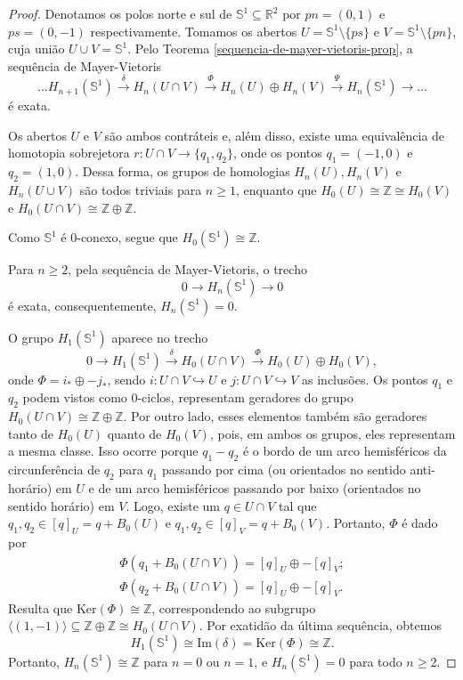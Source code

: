 \begin{proof}
    Denotamos os polos norte e sul de $\mathbb{S}^1\subseteq \mathbb{R}^2$ por $pn=(0,1)$ e $ps=(0,-1)$ respectivamente. Tomamos os abertos $U=\mathbb{S}^1\setminus \{ps\}$ e $V=\mathbb{S}^1\setminus \{pn\}$, cuja união $U\cup V=\mathbb{S}^1$. Pelo Teorema \ref{sequencia-de-mayer-vietoris-prop}, a sequência de Mayer-Vietoris
    \[...H_{n+1}(\mathbb{S}^1)\xrightarrow{\delta} H_n(U\cap V)\xrightarrow{\Phi}H_n(U)\oplus H_n(V)\xrightarrow{\Psi} H_n(\mathbb{S}^1)\rightarrow ...\]
    é exata.

    Os abertos $U$ e $V$ são ambos contráteis e, além disso, existe uma equivalência de homotopia sobrejetora $r:U\cap V\rightarrow\{q_1,q_2\}$, onde os pontos $q_1=(-1,0)$ e $q_2=(1,0)$. Dessa forma, os grupos de homologias $H_n(U),H_n(V)$ e $H_n(U\cup V)$ são todos triviais para $n\ge 1$, enquanto que $H_0(U)\cong \mathbb{Z}\cong H_0 (V)$ e $H_0 (U\cap V)\cong \mathbb{Z}\oplus \mathbb{Z}$.

    Como $\mathbb{S}^1$ é 0-conexo, segue que $H_0(\mathbb{S}^1)\cong \mathbb{Z}$.

    Para $n\ge 2$, pela sequência de Mayer-Vietoris, o trecho  
    \[0\rightarrow H_n (\mathbb{S}^1)\rightarrow 0\]
    é exata, consequentemente, $H_n(\mathbb{S}^1)=0.$

    O grupo $H_1(\mathbb{S}^1)$ aparece no trecho 
    \[0\rightarrow H_1(\mathbb{S}^1)\xrightarrow{\delta} H_0 (U\cap V)\xrightarrow{\Phi} H_0(U)\oplus H_0 (V),\]
    onde $\Phi=i_*\oplus -j_*$, sendo $i:U\cap V\hookrightarrow U$ e $j:U\cap V\hookrightarrow V$ as inclusões. Os pontos $q_1$ e $q_2$ podem vistos como 0-ciclos, representam geradores do grupo $H_0(U\cap V)\cong \mathbb{Z}\oplus \mathbb{Z}$. Por outro lado, esses elementos também são geradores tanto de $H_0 (U)$ quanto de $H_0(V)$, pois, em ambos os grupos, eles representam a mesma classe. Isso ocorre porque $q_1-q_2$ é o bordo de um arco hemisféricos da circunferência de $q_2$ para $q_1$ passando por cima (ou orientados no sentido anti-horário) em $U$ e de um arco hemisféricos passando por baixo (orientados no sentido horário) em $V$. Logo, existe um $q\in U\cap V$ tal que $q_1,q_2\in [q]_U=q+B_0 (U)$ e $q_1,q_2\in [q]_V=q+B_0 (V)$. Portanto, $\Phi$ é dado por 
    \begin{align*}
        \Phi(q_1+B_0(U\cap V))=[q]_U\oplus-[q]_V;\\
        \Phi(q_2+B_0(U\cap V))=[q]_U\oplus -[q]_V.
    \end{align*}
    Resulta que $\text{Ker}(\Phi)\cong \mathbb{Z}$, correspondendo ao subgrupo $\langle (1,-1) \rangle\subseteq \mathbb{Z}\oplus \mathbb{Z}\cong H_0(U\cap V)$. Por exatidão da última sequência, obtemos 
    \[H_1(\mathbb{S}^1)\cong \text{Im}(\delta)=\text{Ker}(\Phi)\cong \mathbb{Z}.\]
    Portanto, $H_n(\mathbb{S}^1)\cong \mathbb{Z}$ para $n=0$ ou $n=1$, e $H_n(\mathbb{S}^1)=0$ para todo $n\ge 2$.
\end{proof}
